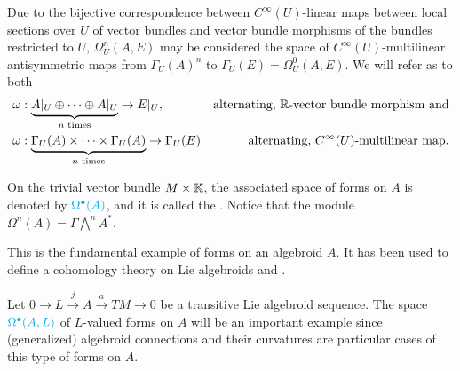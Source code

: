 \begin{remark}\label{remarkFOrmsHave2Ways2FormsALternativeVersion}
Due to the bijective correspondence between $C^\infty(U)$-linear maps between local sections over $U$ of vector bundles and vector bundle morphisms of the bundles restricted to $U$, $\Omega_U^n(A, E)$ may be considered the space of $C^\infty(U)$-multilinear antisymmetric maps from $\Gamma_U(A)^n$ to $\Gamma_U(E) = \Omega_U^0(A, E)$. We will refer as  to both
\begin{align}
    \omega &: \underbrace{A|_U \oplus \cdots \oplus A|_U}_{\text{$n$ times}} \to E|_U, & \text{alternating, $\mathbb{R}$-vector bundle morphism and}\\
    \omega &: \underbrace{\Gamma_U(A) \times \cdots \times \Gamma_U(A)}_{\text{$n$ times}} \to \Gamma_U(E) & \text{alternating, $C^\infty(U)$-multilinear map}.
\end{align}
    
    
\end{remark}

\lin



\begin{example}
On the trivial vector bundle $M \times \mathbb{K}$, the associated space of forms on $A$ is denoted by $\textcolor{cyan}{\textcolor{cyan}{\Omega^\bullet(A)}}$, and it is called the . Notice that the module $\Omega^n(A) = \Gamma \bigwedge^n A^*$.

This is the fundamental example of forms on an algebroid $A$. It has been used to define a cohomology theory on Lie algebroids and .
\end{example}

\begin{example}
Let $0 \to L \xrightarrow{j} A \xrightarrow{a} TM \to 0$ be a transitive Lie algebroid sequence.
The space $\textcolor{cyan}{\Omega^\bullet(A, L)}$ of $L$-valued forms on $A$ will be an important example since (generalized) algebroid connections and their curvatures are particular cases of this type of forms on $A$.
\end{example}

